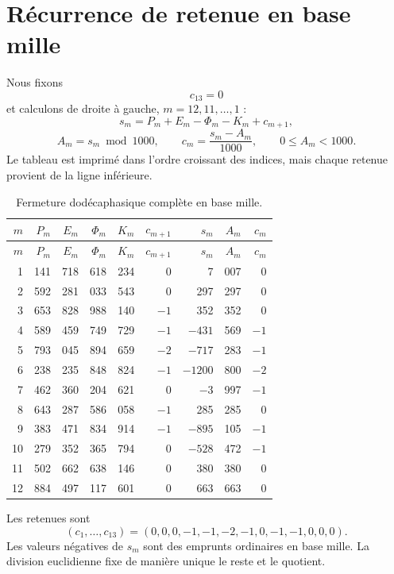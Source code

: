 \section{Récurrence de retenue en base mille}

Nous fixons
\[
c_{13}=0
\]
et calculons de droite à gauche, \(m=12,11,\ldots,1\) :
\[
s_m=P_m+E_m-\Phi_m-K_m+c_{m+1},
\]
\[
A_m=s_m\bmod1000,
\qquad
c_m=\frac{s_m-A_m}{1000},
\qquad0\le A_m<1000.
\]
Le tableau est imprimé dans l'ordre croissant des indices, mais chaque retenue provient de la ligne
inférieure.

\begingroup
\scriptsize
\setlength{\tabcolsep}{3.3pt}
\begin{longtable}{@{}r|rrrr|rr|rr@{}}
\caption{Fermeture dodécaphasique complète en base mille.}\label{tab:acarreo-alpha}\\
\toprule
\(m\)&\(P_m\)&\(E_m\)&\(\Phi_m\)&\(K_m\)&\(c_{m+1}\)&\(s_m\)&\(A_m\)&\(c_m\)\\
\midrule
\endfirsthead
\toprule
\(m\)&\(P_m\)&\(E_m\)&\(\Phi_m\)&\(K_m\)&\(c_{m+1}\)&\(s_m\)&\(A_m\)&\(c_m\)\\
\midrule
\endhead
1&141&718&618&234&0&7&007&0\\
2&592&281&033&543&0&297&297&0\\
3&653&828&988&140&\(-1\)&352&352&0\\
4&589&459&749&729&\(-1\)&\(-431\)&569&\(-1\)\\
5&793&045&894&659&\(-2\)&\(-717\)&283&\(-1\)\\
6&238&235&848&824&\(-1\)&\(-1200\)&800&\(-2\)\\
7&462&360&204&621&0&\(-3\)&997&\(-1\)\\
8&643&287&586&058&\(-1\)&285&285&0\\
9&383&471&834&914&\(-1\)&\(-895\)&105&\(-1\)\\
10&279&352&365&794&0&\(-528\)&472&\(-1\)\\
11&502&662&638&146&0&380&380&0\\
12&884&497&117&601&0&663&663&0\\
\bottomrule
\end{longtable}
\endgroup

Les retenues sont
\[
(c_1,\ldots,c_{13})
=(0,0,0,-1,-1,-2,-1,0,-1,-1,0,0,0).
\]
Les valeurs négatives de \(s_m\) sont des emprunts ordinaires en base mille. La
division euclidienne fixe de manière unique le reste et le quotient.

